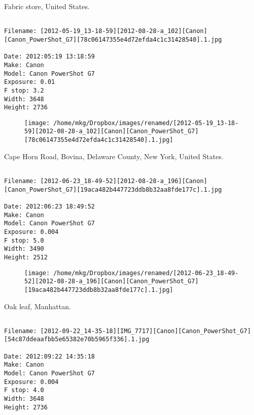 \clearpage
\onecolumn
\noindent Fabric store, United States.
\noindent
\begin{lstlisting}

Filename: [2012-05-19_13-18-59][2012-08-28-a_102][Canon][Canon_PowerShot_G7][78c06147355e4d72efda4c1c31428540].1.jpg

Date: 2012:05:19 13:18:59
Make: Canon
Model: Canon PowerShot G7
Exposure: 0.01
F stop: 3.2
Width: 3648
Height: 2736
\end{lstlisting}
\clearpage

\begin{figure}
\texttt{[image: /home/mkg/Dropbox/images/renamed/[2012-05-19\_13-18-59][2012-08-28-a\_102][Canon][Canon\_PowerShot\_G7][78c06147355e4d72efda4c1c31428540].1.jpg]}
\end{figure}
    
\clearpage
\onecolumn
\noindent Cape Horn Road, Bovina, Delaware County, New York, United States.
\noindent
\begin{lstlisting}

Filename: [2012-06-23_18-49-52][2012-08-28-a_196][Canon][Canon_PowerShot_G7][19aca482b447723ddb8b32aa8fde177c].1.jpg

Date: 2012:06:23 18:49:52
Make: Canon
Model: Canon PowerShot G7
Exposure: 0.004
F stop: 5.0
Width: 3490
Height: 2512
\end{lstlisting}
\clearpage

\begin{figure}
\texttt{[image: /home/mkg/Dropbox/images/renamed/[2012-06-23\_18-49-52][2012-08-28-a\_196][Canon][Canon\_PowerShot\_G7][19aca482b447723ddb8b32aa8fde177c].1.jpg]}
\end{figure}
    
\clearpage
\onecolumn
\noindent Oak leaf, Manhattan.
\noindent
\begin{lstlisting}

Filename: [2012-09-22_14-35-18][IMG_7717][Canon][Canon_PowerShot_G7][54c87ddeaafbb5e65382e70b5965f336].1.jpg

Date: 2012:09:22 14:35:18
Make: Canon
Model: Canon PowerShot G7
Exposure: 0.004
F stop: 4.0
Width: 3648
Height: 2736
\end{lstlisting}
\clearpage

